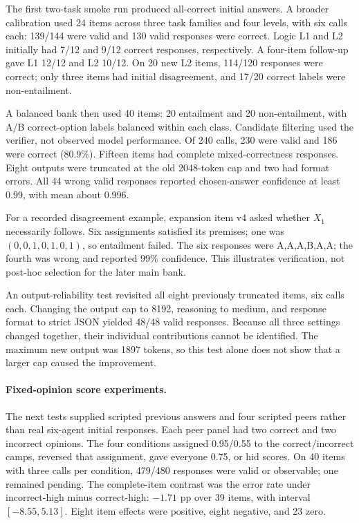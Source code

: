 \documentclass[11pt]{article}
\begin{document}
The first two-task smoke run produced all-correct initial answers. A broader calibration used 24 items across three task families and four levels, with six calls each: 139/144 were valid and 130 valid responses were correct. Logic L1 and L2 initially had 7/12 and 9/12 correct responses, respectively. A four-item follow-up gave L1 12/12 and L2 10/12. On 20 new L2 items, 114/120 responses were correct; only three items had initial disagreement, and 17/20 correct labels were non-entailment.

A balanced bank then used 40 items: 20 entailment and 20 non-entailment, with A/B correct-option labels balanced within each class. Candidate filtering used the verifier, not observed model performance. Of 240 calls, 230 were valid and 186 were correct (80.9\%). Fifteen items had complete mixed-correctness responses. Eight outputs were truncated at the old 2048-token cap and two had format errors. All 44 wrong valid responses reported chosen-answer confidence at least 0.99, with mean about 0.996.

For a recorded disagreement example, expansion item v4 asked whether $X_1$ necessarily follows. Six assignments satisfied its premises; one was $(0,0,1,0,1,0,1)$, so entailment failed. The six responses were A,A,A,B,A,A; the fourth was wrong and reported 99\% confidence. This illustrates verification, not post-hoc selection for the later main bank.

An output-reliability test revisited all eight previously truncated items, six calls each. Changing the output cap to 8192, reasoning to medium, and response format to strict JSON yielded 48/48 valid responses. Because all three settings changed together, their individual contributions cannot be identified. The maximum new output was 1897 tokens, so this test alone does not show that a larger cap caused the improvement.

\paragraph{Fixed-opinion score experiments.}
The next tests supplied scripted previous answers and four scripted peers rather than real six-agent initial responses. Each peer panel had two correct and two incorrect opinions. The four conditions assigned 0.95/0.55 to the correct/incorrect camps, reversed that assignment, gave everyone 0.75, or hid scores. On 40 items with three calls per condition, 479/480 responses were valid or observable; one remained pending. The complete-item contrast was the error rate under incorrect-high minus correct-high: $-1.71$ pp over 39 items, with interval $[-8.55,5.13]$. Eight item effects were positive, eight negative, and 23 zero.
\end{document}
